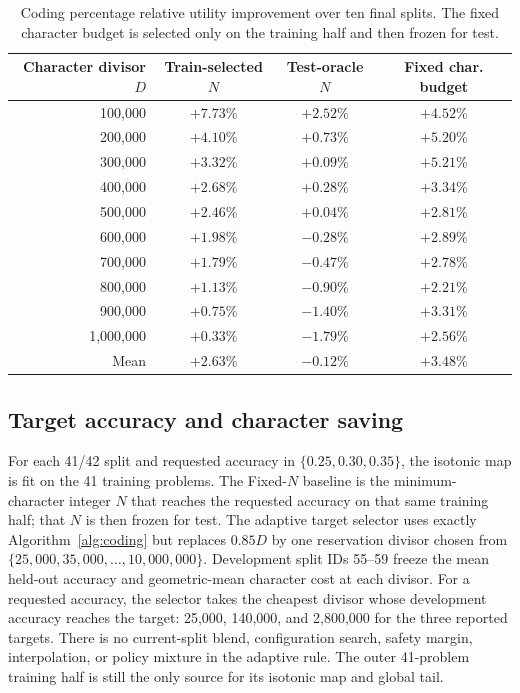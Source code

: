 \begin{table}[H]
\centering
\small
\begin{tabular}{rccc}
\toprule
Character divisor $D$ & Train-selected $N$ & Test-oracle $N$ & Fixed char. budget\\
\midrule
100,000   & $+7.73\%$ & $+2.52\%$ & $+4.52\%$\\
200,000   & $+4.10\%$ & $+0.73\%$ & $+5.20\%$\\
300,000   & $+3.32\%$ & $+0.09\%$ & $+5.21\%$\\
400,000   & $+2.68\%$ & $+0.28\%$ & $+3.34\%$\\
500,000   & $+2.46\%$ & $+0.04\%$ & $+2.81\%$\\
600,000   & $+1.98\%$ & $-0.28\%$ & $+2.89\%$\\
700,000   & $+1.79\%$ & $-0.47\%$ & $+2.78\%$\\
800,000   & $+1.13\%$ & $-0.90\%$ & $+2.21\%$\\
900,000   & $+0.75\%$ & $-1.40\%$ & $+3.31\%$\\
1,000,000 & $+0.33\%$ & $-1.79\%$ & $+2.56\%$\\
\midrule
Mean & $+2.63\%$ & $-0.12\%$ & $+3.48\%$\\
\bottomrule
\end{tabular}
\caption{Coding percentage relative utility improvement over ten final
splits.  The fixed character budget is selected only on the training half
and then frozen for test.}
\label{tab:coding-results}
\end{table}


\subsection{Target accuracy and character saving}
\label{sec:coding-target}

For each 41/42 split and requested accuracy in $\{0.25,0.30,0.35\}$, the
isotonic map is fit on the 41 training problems.  The Fixed-$N$ baseline is
the minimum-character integer $N$ that reaches the requested accuracy on that
same training half; that $N$ is then frozen for test.  The adaptive target
selector uses exactly Algorithm~\ref{alg:coding} but replaces $0.85D$ by one
reservation divisor chosen from
$\{25{,}000,35{,}000,\ldots,10{,}000{,}000\}$.  Development split IDs 55--59
freeze the mean held-out accuracy and geometric-mean character cost at each
divisor.  For a requested accuracy, the selector takes the cheapest divisor
whose development accuracy reaches the target: 25,000, 140,000, and
2,800,000 for the three reported targets.  There is no current-split blend,
configuration search, safety margin, interpolation, or policy mixture in the
adaptive rule.  The outer 41-problem training half is still the only source
for its isotonic map and global tail.

